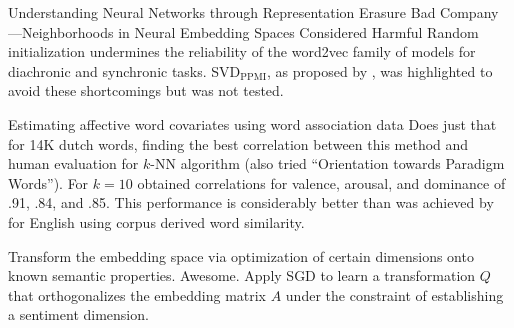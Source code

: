 \cite{li2016understanding}
Understanding Neural Networks through Representation Erasure
\cite{hellrich2016bad}
Bad Company---Neighborhoods in Neural Embedding Spaces Considered Harmful
Random initialization undermines the reliability of the word2vec family of models for diachronic and synchronic tasks.
SVD$_\textrm{PPMI}$, as proposed by \cite{levy2014neural}, was highlighted to avoid these shortcomings but was not tested.

\cite{van2016estimating}
Estimating affective word covariates using word association data
Does just that for 14K dutch words, finding the best correlation between this method and human evaluation for $k$-NN algorithm (also tried ``Orientation towards Paradigm Words'').
For $k=10$ obtained correlations for valence, arousal, and dominance of .91, .84, and .85.
This performance is considerably better than was achieved by \cite{mandera2015useful} for English using corpus derived word similarity.

\cite{rothe2016ultradense}
Transform the embedding space via optimization of certain dimensions onto known semantic properties.
Awesome. Apply SGD to learn a transformation $Q$ that orthogonalizes the embedding matrix $A$ under the constraint of establishing a sentiment dimension.
